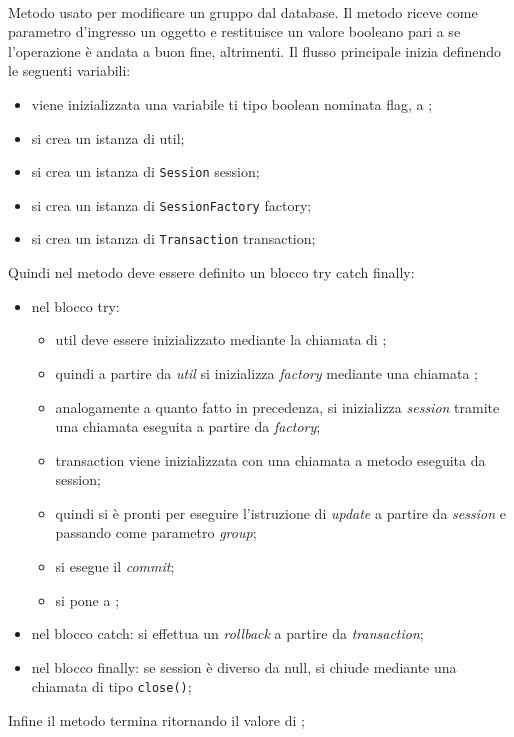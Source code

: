 \begin{description}
	\item{}\\
	Metodo usato per modificare un gruppo dal database. Il metodo riceve come parametro d'ingresso un oggetto  e restituisce un valore booleano  pari a  se l'operazione è andata a buon fine,  altrimenti. Il flusso principale inizia definendo le seguenti variabili:
	\begin{itemize}
		\item viene inizializzata una variabile ti tipo boolean nominata flag, a ;
		\item si crea un istanza di  util;
		\item si crea un istanza di \texttt{Session} session;
		\item si crea un istanza di \texttt{SessionFactory} factory;
		\item si crea un istanza di \texttt{Transaction} transaction;
	\end{itemize}
	Quindi nel metodo deve essere definito un blocco try catch finally:
	\begin{itemize}
		\item nel blocco try:
		\begin{itemize}
			\item util deve essere inizializzato mediante la chiamata  di ;
			\item quindi a partire da \textit{util} si inizializza \textit{factory} mediante una chiamata ;
			\item analogamente a quanto fatto in precedenza, si inizializza \textit{session} tramite una chiamata  eseguita a partire da \textit{factory};
			\item transaction viene inizializzata con una chiamata a metodo  eseguita da session;
			\item quindi si è pronti per eseguire l'istruzione di \textit{update} a partire da \textit{session} e passando come parametro \textit{group};
			\item si esegue il \textit{commit};
			\item si pone  a ;
		\end{itemize}
		\item nel blocco catch: si effettua un \textit{rollback} a partire da \textit{transaction};
		\item nel blocco finally: se session è diverso da null, si chiude mediante una chiamata di tipo \texttt{close()};
	\end{itemize}
	Infine il metodo termina ritornando il valore di ;	
	

\end{description}
